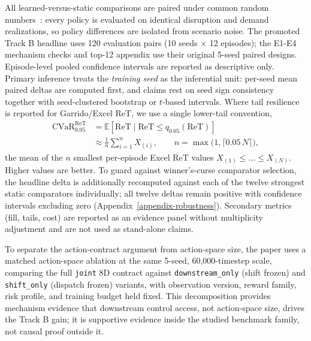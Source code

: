 All learned-versus-static comparisons are paired under common random
numbers~\cite{law2015simulation}: every policy is evaluated on identical
disruption and demand realizations, so policy differences are isolated
from scenario noise. The promoted Track B headline uses 120 evaluation
pairs (10 seeds $\times$ 12 episodes); the E1-E4 mechanism checks and
top-12 appendix use their original 5-seed paired designs. Episode-level
pooled confidence intervals are reported as descriptive only. Primary
inference treats the \emph{training seed} as the inferential unit:
per-seed mean paired deltas are computed first, and claims rest on seed
sign consistency together with seed-clustered bootstrap or $t$-based
intervals. Where tail resilience is reported for Garrido/Excel ReT, we
use a single lower-tail convention,
\begin{equation}
\begin{aligned}
\mathrm{CVaR}^{\mathrm{ReT}}_{0.05}
&= \mathbb{E}\!\left[\mathrm{ReT}\mid
\mathrm{ReT}\le q_{0.05}(\mathrm{ReT})\right] \\
&\approx \frac{1}{n}\sum_{i=1}^{n} X_{(i)},
\qquad n = \max\bigl(1, \lceil 0.05\,N \rceil\bigr),
\end{aligned}
\label{eq:cvar}
\end{equation}
the mean of the $n$ smallest per-episode Excel ReT values
$X_{(1)} \le \dots \le X_{(N)}$. Higher values are better. To guard
against winner's-curse comparator
selection, the headline delta is additionally recomputed against each of
the twelve strongest static comparators individually; all twelve deltas
remain positive with confidence intervals excluding zero
(Appendix~\ref{appendix-robustness}). Secondary metrics (fill, tails,
cost) are reported as an evidence panel without multiplicity adjustment
and are not used as stand-alone claims.

To separate the action-contract argument from action-space size, the
paper uses a matched action-space ablation at the same 5-seed,
60{,}000-timestep scale, comparing the full \texttt{joint} 8D contract
against \texttt{downstream\_only} (shift frozen) and \texttt{shift\_only}
(dispatch frozen) variants, with observation version, reward family,
risk profile, and training budget held fixed. This decomposition provides
mechanism evidence that downstream control access, not action-space
size, drives the Track B gain; it is supportive evidence inside the
studied benchmark family, not causal proof outside
it.

